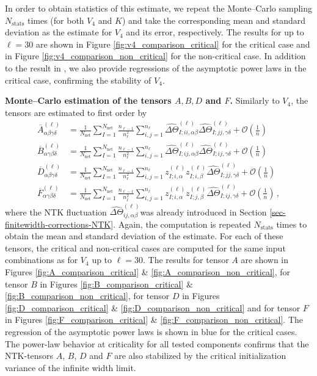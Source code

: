 In order to obtain statistics of this estimate, we repeat the Monte--Carlo sampling $N_\text{stats}$ times (for both $V_4$ and $K$) and take the corresponding mean and standard deviation as the estimate for $V_4$ and its error, respectively. The results for up to $\ell = 30$ are shown in Figure \ref{fig:v4_comparison_critical} for the critical case and in Figure \ref{fig:v4_comparison_non_critical} for the non-critical case. In addition to the result in \cite{banta2024}, we also provide regressions of the asymptotic power laws in the critical case, confirming the stability of $V_{4}$.

\textbf{Monte--Carlo estimation of the tensors $A, B, D$ and $F$.} Similarly to $V_4$, the tensors are estimated to first order by
\begin{align}
  \overline{A}^{(\ell)}_{\alpha\beta\gamma\delta} &= \frac{1}{N_\text{net}}\sum_{I=1}^{N_\text{net}}\frac{n_{\ell-1}}{n_{\ell}^2}\sum_{i,j=1}^{n_{\ell}}\widehat{\Delta\Theta}^{(\ell)}_{I;ii,\alpha\beta}\widehat{\Delta \Theta}_{I;jj,\gamma\delta}^{(\ell)} + \mathcal{O}\left(\frac{1}{n}\right) \\
  \overline{B}^{(\ell)}_{\alpha\gamma\beta\delta} &= \frac{1}{N_\text{net}}\sum_{I=1}^{N_\text{net}}\frac{n_{\ell-1}}{n_{\ell}^2}\sum_{i,j=1}^{n_{\ell}}\widehat{\Delta\Theta}^{(\ell)}_{I;ij,\alpha\beta}\widehat{\Delta \Theta}_{I;ij,\gamma\delta}^{(\ell)} + \mathcal{O}\left(\frac{1}{n}\right) \\
  \overline{D}^{(\ell)}_{\alpha\beta\gamma\delta} &= \frac{1}{N_\text{net}}\sum_{I=1}^{N_\text{net}}\frac{n_{\ell-1}}{n_{\ell}^2}\sum_{i,j=1}^{n_{\ell}}z_{I;i,\alpha}^{(\ell)}z_{I;i,\beta}^{(\ell)}\widehat{\Delta \Theta}_{I;jj,\gamma\delta}^{(\ell)} + \mathcal{O}\left(\frac{1}{n}\right) \\
  \overline{F}^{(\ell)}_{\alpha\gamma\beta\delta} &= \frac{1}{N_\text{net}}\sum_{I=1}^{N_\text{net}}\frac{n_{\ell-1}}{n_{\ell}^2}\sum_{i,j=1}^{n_{\ell}}z_{I;i,\alpha}^{(\ell)}z_{I;j,\beta}^{(\ell)}\widehat{\Delta \Theta}_{I;ij,\gamma\delta}^{(\ell)} + \mathcal{O}\left(\frac{1}{n}\right) \, ,
\end{align}
where the NTK fluctuation $\widehat{\Delta \Theta}^{(\ell)}_{ij,\alpha \beta}$was already introduced in Section \ref{sec-finitewidth-corrections-NTK}. Again, the computation is repeated $N_\text{stats}$ times to obtain the mean and standard deviation of the estimate. For each of these tensors, the critical and non-critical cases are computed for the same input combinations as for $V_4$ up to $\ell =30$. The results for tensor $A$ are shown in Figures \ref{fig:A_comparison_critical} \& \ref{fig:A_comparison_non_critical}, for tensor $B$ in Figures \ref{fig:B_comparison_critical} \& \ref{fig:B_comparison_non_critical}, for tensor $D$ in Figures \ref{fig:D_comparison_critical} \& \ref{fig:D_comparison_non_critical} and for tensor $F$ in Figures \ref{fig:F_comparison_critical} \& \ref{fig:F_comparison_non_critical}. The regression of the asymptotic power laws is shown in blue for the critical cases. The power-law behavior at criticality for all tested components confirms that the NTK-tensors $A$, $B$, $D$ and $F$ are also stabilized by the critical initialization variance of the infinite width limit.

